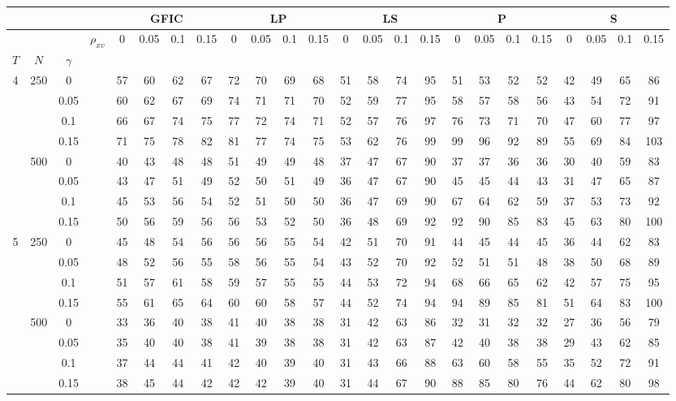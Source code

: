 \begin{tabular}{cccc|cccc|cccc|cccc|cccc|cccc} 
 \hline \hline 
\multicolumn{4}{c}{}&\multicolumn{4}{c}{GFIC}&\multicolumn{4}{c}{LP}&\multicolumn{4}{c}{LS}&\multicolumn{4}{c}{P}&\multicolumn{4}{c}{S}\\ 
 \hline
 &  &  & $\rho_{xv}$ & 0 & 0.05 & 0.1 & 0.15 & 0 & 0.05 & 0.1 & 0.15 & 0 & 0.05 & 0.1 & 0.15 & 0 & 0.05 & 0.1 & 0.15 & 0 & 0.05 & 0.1 & 0.15 \\
$T$ & $N$ & $\gamma$ &  &  &  &  &  &  &  &  &  &  &  &  &  &  &  &  &  &  &  &  &  \\
\hline
4 & 250 & 0 &  & 57 & 60 & 62 & 67 & 72 & 70 & 69 & 68 & 51 & 58 & 74 & 95 & 51 & 53 & 52 & 52 & 42 & 49 & 65 & 86 \\
 &  & 0.05 &  & 60 & 62 & 67 & 69 & 74 & 71 & 71 & 70 & 52 & 59 & 77 & 95 & 58 & 57 & 58 & 56 & 43 & 54 & 72 & 91 \\
 &  & 0.1 &  & 66 & 67 & 74 & 75 & 77 & 72 & 74 & 71 & 52 & 57 & 76 & 97 & 76 & 73 & 71 & 70 & 47 & 60 & 77 & 97 \\
 &  & 0.15 &  & 71 & 75 & 78 & 82 & 81 & 77 & 74 & 75 & 53 & 62 & 76 & 99 & 99 & 96 & 92 & 89 & 55 & 69 & 84 & 103 \\
 \hline
 & 500 & 0 &  & 40 & 43 & 48 & 48 & 51 & 49 & 49 & 48 & 37 & 47 & 67 & 90 & 37 & 37 & 36 & 36 & 30 & 40 & 59 & 83 \\
 &  & 0.05 &  & 43 & 47 & 51 & 49 & 52 & 50 & 51 & 49 & 36 & 47 & 67 & 90 & 45 & 45 & 44 & 43 & 31 & 47 & 65 & 87 \\
 &  & 0.1 &  & 45 & 53 & 56 & 54 & 52 & 51 & 50 & 50 & 36 & 47 & 69 & 90 & 67 & 64 & 62 & 59 & 37 & 53 & 73 & 92 \\
 &  & 0.15 &  & 50 & 56 & 59 & 56 & 56 & 53 & 52 & 50 & 36 & 48 & 69 & 92 & 92 & 90 & 85 & 83 & 45 & 63 & 80 & 100 \\
 \hline
5 & 250 & 0 &  & 45 & 48 & 54 & 56 & 56 & 56 & 55 & 54 & 42 & 51 & 70 & 91 & 44 & 45 & 44 & 45 & 36 & 44 & 62 & 83 \\
 &  & 0.05 &  & 48 & 52 & 56 & 55 & 58 & 56 & 55 & 54 & 43 & 52 & 70 & 92 & 52 & 51 & 51 & 48 & 38 & 50 & 68 & 89 \\
 &  & 0.1 &  & 51 & 57 & 61 & 58 & 59 & 57 & 55 & 55 & 44 & 53 & 72 & 94 & 68 & 66 & 65 & 62 & 42 & 57 & 75 & 95 \\
 &  & 0.15 &  & 55 & 61 & 65 & 64 & 60 & 60 & 58 & 57 & 44 & 52 & 74 & 94 & 94 & 89 & 85 & 81 & 51 & 64 & 83 & 100 \\
 \hline
 & 500 & 0 &  & 33 & 36 & 40 & 38 & 41 & 40 & 38 & 38 & 31 & 42 & 63 & 86 & 32 & 31 & 32 & 32 & 27 & 36 & 56 & 79 \\
 &  & 0.05 &  & 35 & 40 & 40 & 38 & 41 & 39 & 38 & 38 & 31 & 42 & 63 & 87 & 42 & 40 & 38 & 38 & 29 & 43 & 62 & 85 \\
 &  & 0.1 &  & 37 & 44 & 44 & 41 & 42 & 40 & 39 & 40 & 31 & 43 & 66 & 88 & 63 & 60 & 58 & 55 & 35 & 52 & 72 & 91 \\
 &  & 0.15 &  & 38 & 45 & 44 & 42 & 42 & 42 & 39 & 40 & 31 & 44 & 67 & 90 & 88 & 85 & 80 & 76 & 44 & 62 & 80 & 98 \\
\hline
\end{tabular}
